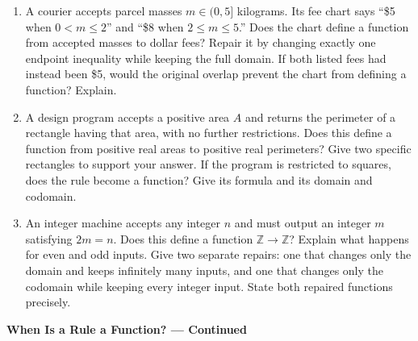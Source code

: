 \documentclass[11pt]{article}
\begin{document}
\begin{enumerate}[leftmargin=*,itemsep=0pt,resume]
  \item A courier accepts parcel masses $m\in(0,5]$ kilograms. Its fee chart
  says ``\$5 when $0<m\le2$'' and ``\$8 when $2\le m\le5$.'' Does the chart
  define a function from accepted masses to dollar fees? Repair it by
  changing exactly one endpoint inequality while keeping the full domain.
  If both listed fees had instead been \$5, would the original overlap
  prevent the chart from defining a function? Explain.

  \item A design program accepts a positive area $A$ and returns the
  perimeter of a rectangle having that area, with no further restrictions.
  Does this define a function from positive real areas to positive real
  perimeters? Give two specific rectangles to support your answer. If the
  program is restricted to squares, does the rule become a function?
  Give its formula and its domain and codomain.

  \item An integer machine accepts any integer $n$ and must output an
  integer $m$ satisfying $2m=n$. Does this define a function
  $\mathbb Z\to\mathbb Z$? Explain what happens for even and odd inputs.
  Give two separate repairs: one that changes only the domain and keeps
  infinitely many inputs, and one that changes only the codomain while
  keeping every integer input. State both repaired functions precisely.
\end{enumerate}

\newpage
\begin{center}
  {\large\textbf{When Is a Rule a Function? --- Continued}}
\end{center}
\end{document}
